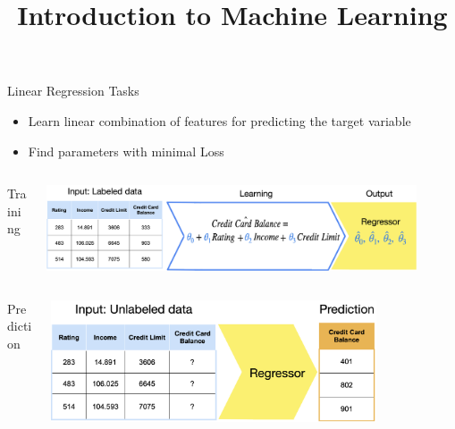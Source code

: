 \documentclass[11pt,compress,t,notes=noshow, xcolor=table]{beamer}
\title{Introduction to Machine Learning}
\date{}
\begin{document}
\sloppy

\begin{vbframe}{Linear Regression Tasks}
\begin{itemize}
\item \small Learn linear combination of features for predicting the target variable
\item \small Find parameters with minimal Loss
\end{itemize}

\begin{columns}  
\begin{column}{0.1\textwidth} 
\begin{center}
Training
\end{center}
\end{column}
\begin{column}{0.9\textwidth} 
\begin{center}
  \includegraphics[width = 0.9\textwidth]{slides/supervised-regression/figure_man/nutshell-regression-learning-task.png}
\end{center}
\end{column}
\end{columns}
\begin{columns}
\begin{column}{0.1\textwidth} 
\begin{center}
Prediction
\end{center}
\end{column}
\begin{column}{0.9\textwidth} 
\begin{center}
  \includegraphics[width = 0.8\textwidth]{slides/supervised-regression/figure_man/nutshell-regression-prediction-task.png} 
\end{center}
\end{column}
\end{columns}

\end{vbframe}
\end{document}
